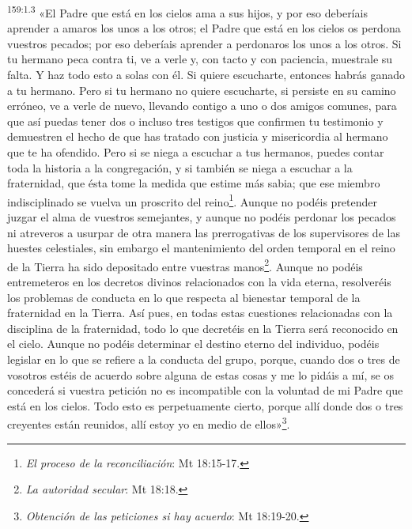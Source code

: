 \par 
\textsuperscript{159:1.3} «El Padre que está en los cielos ama a sus hijos, y por eso deberíais aprender a amaros los unos a los otros; el Padre que está en los cielos os perdona vuestros pecados; por eso deberíais aprender a perdonaros los unos a los otros. Si tu hermano peca contra ti, ve a verle y, con tacto y con paciencia, muestrale su falta. Y haz todo esto a solas con él. Si quiere escucharte, entonces habrás ganado a tu hermano. Pero si tu hermano no quiere escucharte, si persiste en su camino erróneo, ve a verle de nuevo, llevando contigo a uno o dos amigos comunes, para que así puedas tener dos o incluso tres testigos que confirmen tu testimonio y demuestren el hecho de que has tratado con justicia y misericordia al hermano que te ha ofendido. Pero si se niega a escuchar a tus hermanos, puedes contar toda la historia a la congregación, y si también se niega a escuchar a la fraternidad, que ésta tome la medida que estime más sabia; que ese miembro indisciplinado se vuelva un proscrito del reino\footnote{\textit{El proceso de la reconciliación}: Mt 18:15-17.}. Aunque no podéis pretender juzgar el alma de vuestros semejantes, y aunque no podéis perdonar los pecados ni atreveros a usurpar de otra manera las prerrogativas de los supervisores de las huestes celestiales, sin embargo el mantenimiento del orden temporal en el reino de la Tierra ha sido depositado entre vuestras manos\footnote{\textit{La autoridad secular}: Mt 18:18.}. Aunque no podéis entremeteros en los decretos divinos relacionados con la vida eterna, resolveréis los problemas de conducta en lo que respecta al bienestar temporal de la fraternidad en la Tierra. Así pues, en todas estas cuestiones relacionadas con la disciplina de la fraternidad, todo lo que decretéis en la Tierra será reconocido en el cielo. Aunque no podéis determinar el destino eterno del individuo, podéis legislar en lo que se refiere a la conducta del grupo, porque, cuando dos o tres de vosotros estéis de acuerdo sobre alguna de estas cosas y me lo pidáis a mí, se os concederá si vuestra petición no es incompatible con la voluntad de mi Padre que está en los cielos. Todo esto es perpetuamente cierto, porque allí donde dos o tres creyentes están reunidos, allí estoy yo en medio de ellos»\footnote{\textit{Obtención de las peticiones si hay acuerdo}: Mt 18:19-20.}.

